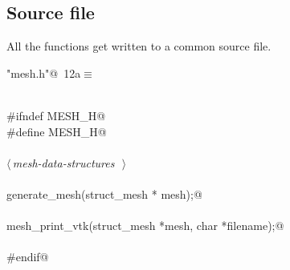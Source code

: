 \documentclass[a4paper,11pt]{article}
\begin{document}
\subsection{Source file}
All the functions get written to a common source file.

\begin{flushleft} \small
\begin{minipage}{\linewidth}\label{scrap13}\raggedright\small
{} \verb@"mesh.h"@\nobreak\ {\footnotesize {12a}}$\equiv$
\vspace{-1ex}
\begin{list}{}{} \item
\mbox{}\verb@@\\
\mbox{}\verb@#ifndef MESH_H@\\
\mbox{}\verb@#define MESH_H@\\
\mbox{}\verb@@\\
\mbox{}\verb@@\hbox{$\langle\,${\itshape mesh-data-structures}\nobreak\ {\footnotesize {}}$\,\rangle$}\verb@@\\
\mbox{}\verb@@\\
\mbox{}\verb@int generate_mesh(struct_mesh * mesh);@\\
\mbox{}\verb@@\\
\mbox{}\verb@int mesh_print_vtk(struct_mesh *mesh, char *filename);@\\
\mbox{}\verb@@\\
\mbox{}\verb@#endif@\\
\mbox{}\verb@@{\NWsep}
\end{list}
\vspace{-1.5ex}
\footnotesize
\begin{list}{}{\setlength{\itemsep}{-\parsep}\setlength{\itemindent}{-\leftmargin}}

\item{}
\end{list}
\end{minipage}\vspace{4ex}
\end{flushleft}
\end{document}
